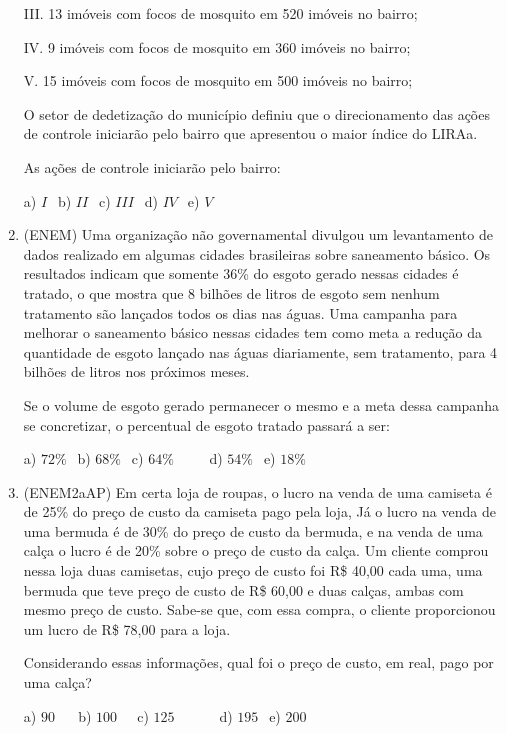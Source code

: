 \begin{multicols*}{2}
\begin{enumerate}
III. 13 imóveis com focos de mosquito em 520 imóveis no bairro;

IV. 9 imóveis com focos de mosquito em 360 imóveis no bairro;

V. 15 imóveis com focos de mosquito em 500 imóveis no bairro;

O setor de dedetização do município definiu que o direcionamento das ações de controle iniciarão pelo bairro
que apresentou o maior índice do LIRAa.

As ações de controle iniciarão pelo bairro:

	a) $ I \ \ $ b) $ II \ \ $ c) $III \ \ $ d) $ IV \ \ $ e) $ V \ \ $

	\item (ENEM) Uma organização não governamental divulgou um levantamento de dados realizado em algumas cidades
brasileiras sobre saneamento básico. Os resultados indicam que somente 36\% do esgoto gerado nessas cidades é tratado, o que mostra que 8 bilhões de litros de esgoto sem nenhum tratamento são lançados todos os dias nas águas. Uma campanha para melhorar o saneamento básico nessas cidades tem como meta a redução da quantidade de esgoto lançado nas águas diariamente, sem tratamento, para 4 bilhões de litros nos próximos meses.

Se o volume de esgoto gerado permanecer o mesmo e a meta dessa campanha se concretizar, o percentual de esgoto tratado passará a ser:

	a) $72\% \ \ $ b) $68\% \ \ $ c) $64\% \ \ \ \ \ \ \ \ \ \ $ d) $54\% \ \ $ e) $18\% \ \ $

	\item (ENEM2aAP) Em certa loja de roupas, o lucro na venda de uma camiseta é de 25\% do preço de custo da camiseta pago pela loja, Já o lucro na venda de uma bermuda é de 30\% do preço de custo da bermuda, e na venda de uma calça o lucro é de 20\% sobre o preço de custo da calça. Um cliente comprou nessa loja duas camisetas, cujo preço de custo foi R\$ 40,00 cada uma, uma bermuda que teve preço de custo de R\$ 60,00 e duas calças, ambas com mesmo
preço de custo. Sabe-se que, com essa compra, o cliente proporcionou um lucro de R\$ 78,00 para a loja.

Considerando essas informações, qual foi o preço de custo, em real, pago por uma calça?

	a) $90 \ \ \ \ \ \ $ b) $100 \ \ \ \ \ $ c) $125 \ \ \ \ \ \ \ \ \ \ \ \ \ $ d) $195 \ \ $ e) $200 \ \ $

	\end{enumerate}
	

\end{multicols*}

